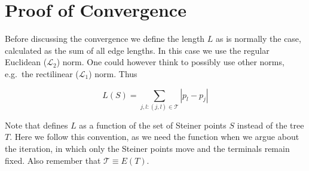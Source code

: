 { \abnormalparskip{0pt}
\chapter{Proof of Convergence}
\label{cha:proof-convergence} }

Before discussing the convergence we define the length $L$ as is normally the
case, calculated as the sum of all edge lengths. In this case we use the regular
Euclidean ($\mathcal{L}_2$) norm. One could however think to possibly use other
norms, e.g.\ the rectilinear ($\mathcal{L}_1$) norm. Thus

\begin{equation}
  \label{eq:23}
  L(S) = \sum_{j,l : (j,l) \in \mathcal{T}} | p_l - p_j |
\end{equation}

Note that \textcite{smith1992} defines $L$ as a function of the set of
Steiner points $S$ instead of the tree $T$. Here we follow this
convention, as we need the function when we argue about the iteration, in which
only the Steiner points move and the terminals remain fixed. Also remember
that $\mathcal{T} \equiv E(T)$.

